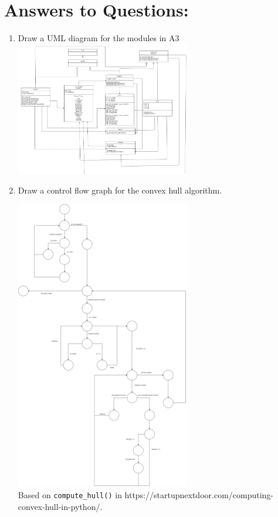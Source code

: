 \documentclass[12pt]{article}
\begin{document}
\section*{Answers to Questions:}
\begin{enumerate}
	\item Draw a UML diagram for the modules in A3
\includegraphics[width=0.6\textwidth]{A3.png}\\
  
	\item Draw a control flow graph for the convex hull algorithm.

\begin{center}
  \includegraphics[width=0.6\textwidth]{ControlFlow.png}\\
  Based on \verb|compute_hull()| in https://startupnextdoor.com/computing-convex-hull-in-python/.
\end{center}
\end{enumerate}
\end{document}
